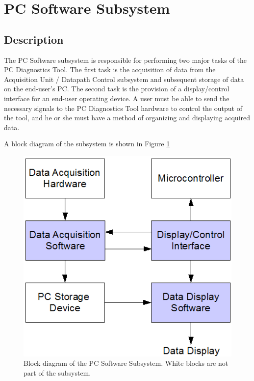 \section[PC Software]{PC Software Subsystem}
\subsection{Description}
	The PC Software subsystem is responsible for performing two major tasks of 
the PC Diagnostics Tool. The first task is the acquisition of data from the 
Acquisition Unit / Datapath Control subsystem and subsequent storage of data on 
the end-user's PC. The second task is the provision of a display/control 
interface for an end-user operating device. A user must be able to send the 
necessary signals to the PC Diagnostics Tool hardware to control the output of 
the tool, and he or she must have a method of organizing and displaying 
acquired data.

A block diagram of the subsystem is shown in Figure \ref{fig:pcsoft sub diagram}


\begin{figure}[bhp]
\begin{center}
\includegraphics[scale=0.75]{../drawings/pcsoft_sub_diagram.png}
\end{center}
\caption[PC Software Block Diagram]{Block diagram of the PC Software Subsystem. White blocks
are not part of the subsystem.}
\label{fig:pcsoft sub diagram}
\end{figure}



